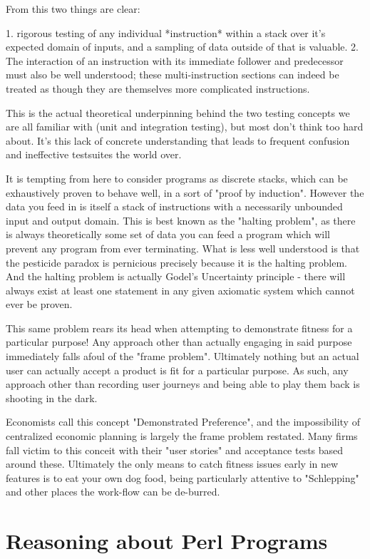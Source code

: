 \documentclass[twoside]{article}
\begin{document}
From this two things are clear:

1. rigorous testing of any individual *instruction* within a stack over it's expected domain of inputs, and a sampling of data outside of that is valuable.
2. The interaction of an instruction with its immediate follower and predecessor must also be well understood; these multi-instruction sections can indeed be treated as though they are themselves more complicated instructions.

This is the actual theoretical underpinning behind the two testing concepts we are all familiar with (unit and integration testing), but most don't think too hard about.
It's this lack of concrete understanding that leads to frequent confusion and ineffective testsuites the world over.

It is tempting from here to consider programs as discrete stacks, which can be exhaustively proven to behave well, in a sort of "proof by induction".
However the data you feed in is itself a stack of instructions with a necessarily unbounded input and output domain.
This is best known as the "halting problem", as there is always theoretically some set of data you can feed a program which will prevent any program from ever terminating.
What is less well understood is that the pesticide paradox is pernicious precisely because it is the halting problem.
And the halting problem is actually Godel's Uncertainty principle - there will always exist at least one statement in any given axiomatic system which cannot ever be proven.

This same problem rears its head when attempting to demonstrate fitness for a particular purpose!
Any approach other than actually engaging in said purpose immediately falls afoul of the "frame problem".
Ultimately nothing but an actual user can actually accept a product is fit for a particular purpose.
As such, any approach other than recording user journeys and being able to play them back is shooting in the dark.

Economists call this concept "Demonstrated Preference", and the impossibility of centralized economic planning is largely the frame problem restated.
Many firms fall victim to this conceit with their "user stories" and acceptance tests based around these.
Ultimately the only means to catch fitness issues early in new features is to eat your own dog food, being particularly attentive to "Schlepping" and other places the work-flow can be de-burred.

\section{Reasoning about Perl Programs}
\end{document}
